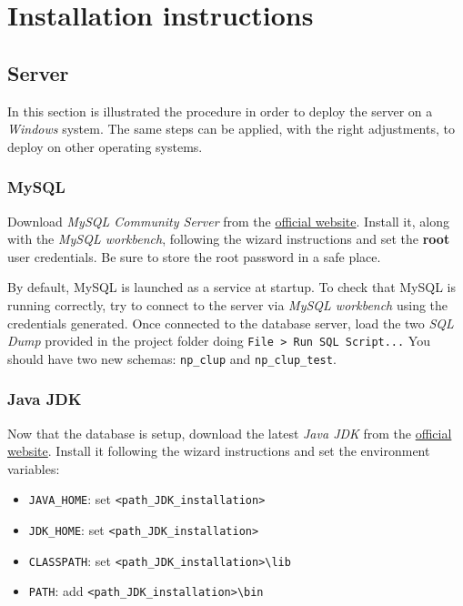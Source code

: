 \chapter{Installation instructions}
\section{Server}
In this section is illustrated the procedure in order to deploy the server on a \textit{Windows} system.\newline
The same steps can be applied, with the right adjustments, to deploy on other operating systems.

\subsection{MySQL}
Download \textit{MySQL Community Server} from the \href{https://dev.mysql.com/downloads/mysql/}{official website}.\newline
Install it, along with the \textit{MySQL workbench}, following the wizard instructions and set the \textbf{root} user credentials. Be sure to store the root password in a safe place.

By default, MySQL is launched as a service at startup.\newline
To check that MySQL is running correctly, try to connect to the server via \textit{MySQL workbench} using the credentials generated.\newline
Once connected to the database server, load the two \textit{SQL Dump} provided in the project folder doing \verb|File > Run SQL Script...|\newline
You should have two new schemas: \verb|np_clup| and \verb|np_clup_test|.

\subsection{Java JDK}
Now that the database is setup, download the latest \textit{Java JDK} from the \href{https://www.oracle.com/it/java/technologies/javase-jdk15-downloads.html/}{official website}.\newline
Install it following the wizard instructions and set the environment variables:
\begin{itemize}
	\item \verb|JAVA_HOME|: set \verb|<path_JDK_installation>|
	\item \verb|JDK_HOME|: set \verb|<path_JDK_installation>|
	\item \verb|CLASSPATH|: set \verb|<path_JDK_installation>\lib|
	\item \verb|PATH|: add \verb|<path_JDK_installation>\bin|
\end{itemize}
\clearpage
